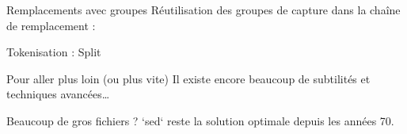 \begin{frame}{Remplacements avec groupes}
  Réutilisation des groupes de capture dans la chaîne de remplacement :
\end{frame}

\begin{frame}{Tokenisation : Split}
\end{frame}

\begin{frame}{Pour aller plus loin (ou plus vite)}
  Il existe encore beaucoup de subtilités et techniques avancées…

  Beaucoup de gros fichiers ? `sed` reste la solution optimale depuis les années 70.
\end{frame}

